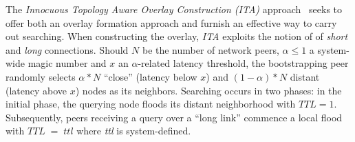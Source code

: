 The \emph{Innocuous Topology Aware Overlay Construction (ITA)} approach~\cite{PRFM2009} seeks to offer both an overlay formation approach and furnish 
an effective way to carry out searching.
When constructing the overlay, \emph{ITA} exploits the notion of 
of \emph{short} and \emph{long} connections.
Should $N$ be the number of network peers, 
$\alpha \leq 1 $ a system-wide magic number
and $x$ an $\alpha$-related latency threshold,
the bootstrapping peer randomly selects $\alpha \ast N$ 
``close'' (latency below $x$) and 
$\left( 1 - \alpha \right) \ast N$ distant (latency above $x$) nodes
as its neighbors. 
Searching occurs in two phases: in the initial phase, the querying node
floods its distant neighborhood  with $TTL = 1$.
Subsequently, peers receiving a query over a ``long link'' commence a 
local flood with $TTL\;=\;ttl$ where \emph{ttl} is system-defined.

